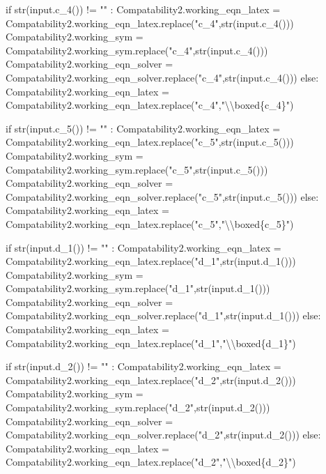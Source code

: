\documentclass[
  letterpaper,
  DIV=11,
  numbers=noendperiod]{scrreprt}
\newenvironment{Shaded}{\begin{snugshade}}{\end{snugshade}}
\newcommand{\NormalTok}[1]{\textcolor[rgb]{0.00,0.23,0.31}{#1}}
\begin{document}
\begin{Shaded}
\begin{Highlighting}[]
\NormalTok{            if str(input.c\_4()) != "" : }
\NormalTok{                Compatability2.working\_eqn\_latex = Compatability2.working\_eqn\_latex.replace("c\_4",str(input.c\_4()))}
\NormalTok{                Compatability2.working\_sym = Compatability2.working\_sym.replace("c\_4",str(input.c\_4()))}
\NormalTok{                Compatability2.working\_eqn\_solver = Compatability2.working\_eqn\_solver.replace("c\_4",str(input.c\_4()))}
\NormalTok{            else:}
\NormalTok{                Compatability2.working\_eqn\_latex = Compatability2.working\_eqn\_latex.replace("c\_4","\textbackslash{}\textbackslash{}boxed\{c\_4\}")}
            
\NormalTok{            if str(input.c\_5()) != "" : }
\NormalTok{                Compatability2.working\_eqn\_latex = Compatability2.working\_eqn\_latex.replace("c\_5",str(input.c\_5()))}
\NormalTok{                Compatability2.working\_sym = Compatability2.working\_sym.replace("c\_5",str(input.c\_5()))}
\NormalTok{                Compatability2.working\_eqn\_solver = Compatability2.working\_eqn\_solver.replace("c\_5",str(input.c\_5()))}
\NormalTok{            else:}
\NormalTok{                Compatability2.working\_eqn\_latex = Compatability2.working\_eqn\_latex.replace("c\_5","\textbackslash{}\textbackslash{}boxed\{c\_5\}")}
                    
\NormalTok{            if str(input.d\_1()) != "" : }
\NormalTok{                Compatability2.working\_eqn\_latex = Compatability2.working\_eqn\_latex.replace("d\_1",str(input.d\_1()))}
\NormalTok{                Compatability2.working\_sym = Compatability2.working\_sym.replace("d\_1",str(input.d\_1()))}
\NormalTok{                Compatability2.working\_eqn\_solver = Compatability2.working\_eqn\_solver.replace("d\_1",str(input.d\_1()))}
\NormalTok{            else:}
\NormalTok{                Compatability2.working\_eqn\_latex = Compatability2.working\_eqn\_latex.replace("d\_1","\textbackslash{}\textbackslash{}boxed\{d\_1\}")}
            
\NormalTok{            if str(input.d\_2()) != "" : }
\NormalTok{                Compatability2.working\_eqn\_latex = Compatability2.working\_eqn\_latex.replace("d\_2",str(input.d\_2()))}
\NormalTok{                Compatability2.working\_sym = Compatability2.working\_sym.replace("d\_2",str(input.d\_2()))}
\NormalTok{                Compatability2.working\_eqn\_solver = Compatability2.working\_eqn\_solver.replace("d\_2",str(input.d\_2()))}
\NormalTok{            else:}
\NormalTok{                Compatability2.working\_eqn\_latex = Compatability2.working\_eqn\_latex.replace("d\_2","\textbackslash{}\textbackslash{}boxed\{d\_2\}")}
            

\end{Highlighting}
\end{Shaded}
\end{document}
